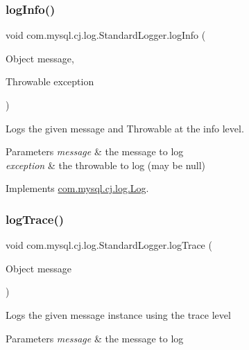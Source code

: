 \subsubsection{\texorpdfstring{log\+Info()}{logInfo()}\hspace{0.1cm}{\footnotesize\ttfamily [2/2]}}
{\footnotesize\ttfamily void com.\+mysql.\+cj.\+log.\+Standard\+Logger.\+log\+Info (\begin{DoxyParamCaption}\item[{Object}]{message,  }\item[{Throwable}]{exception }\end{DoxyParamCaption})}

Logs the given message and Throwable at the \textquotesingle{}info\textquotesingle{} level.


\begin{DoxyParams}{Parameters}
{\em message} & the message to log \\
\hline
{\em exception} & the throwable to log (may be null) \\
\hline
\end{DoxyParams}


Implements \mbox{\hyperlink{interfacecom_1_1mysql_1_1cj_1_1log_1_1_log_abad2a5a44ff04b24bf46a58997e4f7da}{com.\+mysql.\+cj.\+log.\+Log}}.

\mbox{\label{classcom_1_1mysql_1_1cj_1_1log_1_1_standard_logger_a31c4a397719a30877e689fcba2e1054a}} 
\subsubsection{\texorpdfstring{log\+Trace()}{logTrace()}\hspace{0.1cm}{\footnotesize\ttfamily [1/2]}}
{\footnotesize\ttfamily void com.\+mysql.\+cj.\+log.\+Standard\+Logger.\+log\+Trace (\begin{DoxyParamCaption}\item[{Object}]{message }\end{DoxyParamCaption})}

Logs the given message instance using the \textquotesingle{}trace\textquotesingle{} level


\begin{DoxyParams}{Parameters}
{\em message} & the message to log \\
\hline
\end{DoxyParams}


